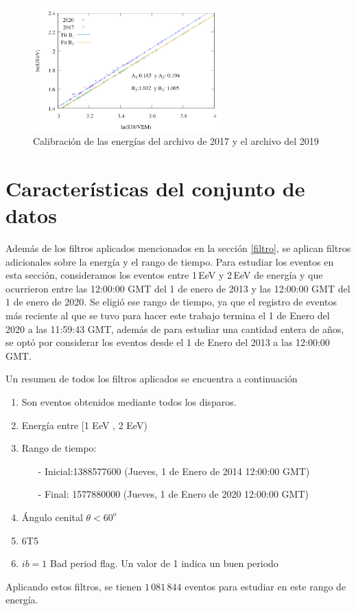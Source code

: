         \begin{figure}[H]
          \centering
          \includegraphics[width=0.65\textwidth]{../0_Introduccion/comparacion_reconstruccion.png}
          \caption{Calibración de las energías del archivo de 2017 y el archivo del 2019}
          \label{fig:calibracionE}
        \end{figure}
	




	\section{Características del conjunto de datos} \label{specs}
	

	Además de los filtros aplicados mencionados en la sección \ref{filtro}, se aplican filtros adicionales sobre la energía y el rango de tiempo. Para estudiar los eventos en esta sección, consideramos los eventos entre 1\,EeV y 2\,EeV de energía y que ocurrieron entre las 12:00:00 GMT del 1 de enero de 2013 y las 12:00:00 GMT del 1 de enero de 2020. Se  eligió ese rango de tiempo, ya que el registro de eventos más reciente al que se tuvo para hacer este trabajo termina el 1 de Enero del 2020  a las 11:59:43 GMT, además de para estudiar una cantidad entera de años, se optó por considerar los eventos desde el 1 de Enero del 2013 a las 12:00:00 GMT.

	Un resumen de todos los filtros aplicados se encuentra a continuación
		\begin{enumerate}
			\item Son eventos obtenidos mediante todos los disparos.
			\item Energía entre  [1 EeV , 2 EeV)
			\item Rango de tiempo:
			\begin{itemize}
				\item[-] Inicial:1388577600 (Jueves, 1 de Enero de 2014 12:00:00 GMT)
				\item[-] Final: 1577880000  (Jueves, 1 de Enero de 2020 12:00:00 GMT)
			\end{itemize}
			\item Ángulo cenital $\theta < 60^o$
			\item 6T5
			\item $ib=1$ Bad period flag. Un valor de 1 indica un buen periodo
		\end{enumerate}
	Aplicando estos filtros, se tienen $1\,081\,844$ eventos para estudiar en este rango de energía.
			
